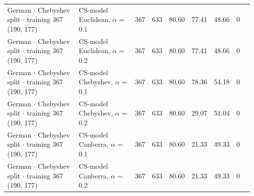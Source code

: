 \begin{longtable}{llrrrrrrl}
  German $\cdot$ Chebyshev split $\cdot$ training 367 (190, 177) & CS-model Euclidean, $\alpha$ = 0.1 & 367 & 633 & 80.60 & 77.41 & 48.66 & 0 &  \\
  German $\cdot$ Chebyshev split $\cdot$ training 367 (190, 177) & CS-model Euclidean, $\alpha$ = 0.2 & 367 & 633 & 80.60 & 77.41 & 48.66 & 0 &  \\
  German $\cdot$ Chebyshev split $\cdot$ training 367 (190, 177) & CS-model Chebyshev, $\alpha$ = 0.1 & 367 & 633 & 80.60 & 78.36 & 54.18 & 0 &  \\
  German $\cdot$ Chebyshev split $\cdot$ training 367 (190, 177) & CS-model Chebyshev, $\alpha$ = 0.2 & 367 & 633 & 80.60 & 29.07 & 51.04 & 0 &  \\
  German $\cdot$ Chebyshev split $\cdot$ training 367 (190, 177) & CS-model Canberra, $\alpha$ = 0.1 & 367 & 633 & 80.60 & 21.33 & 49.33 & 0 &  \\
  German $\cdot$ Chebyshev split $\cdot$ training 367 (190, 177) & CS-model Canberra, $\alpha$ = 0.2 & 367 & 633 & 80.60 & 21.33 & 49.33 & 0 &  \\
\end{longtable}
